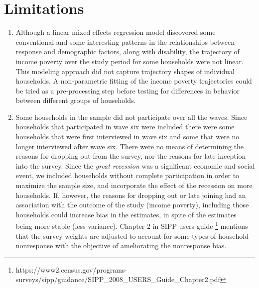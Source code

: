 \documentclass[11pt]{extarticle} %
\begin{document}
\section*{Limitations}
\begin{enumerate}
\item Although a linear mixed effects regression model discovered some conventional and some interesting patterns in the relationships between response and demographic factors, along with disability, the trajectory of income poverty over the study period for some households were not linear. This modeling approach did not capture trajectory shapes of individual households. A non-parametric fitting of the income poverty trajectories could be tried as a pre-processing step before testing for differences in behavior between different groups of households. 

\item Some households in the sample did not participate over all the waves. Since households that participated in wave six were included there were some households that were first interviewed in wave six and some that were no longer interviewed after wave six. There were no means of determining the reasons for dropping out from the survey, nor the reasons for late inception into the survey. Since the {\emph{great recession}} was a significant economic and social event, we included households without complete participation in order to maximize the sample size, and incorporate the effect of the recession on more households. If, however, the reasons for dropping out or late joining had an association with the outcome of the study (income poverty), including those households could increase bias in the estimates, in spite of the estimates being more stable (less variance). Chapter 2 in SIPP users guide \footnote{https://www2.census.gov/programs-surveys/sipp/guidance/SIPP\_2008\_USERS\_Guide\_Chapter2.pdf} mentions that the survey weights are adjusted to account for some types of household nonresponse with the objective of ameliorating the nonresponse bias. 
\end{enumerate}

\newpage




\newpage

\end{document}
